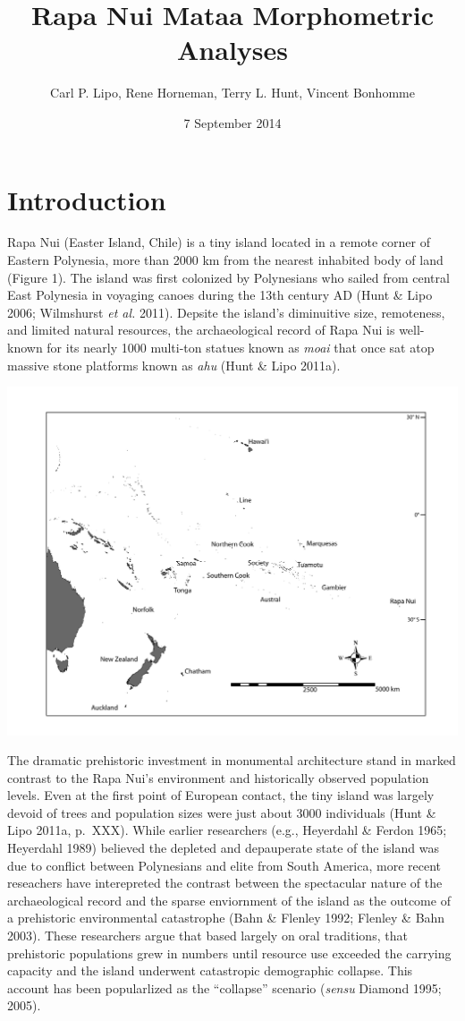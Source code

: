 \documentclass[]{article}
\title{Rapa Nui Mataa Morphometric Analyses}
\author{Carl P. Lipo, Rene Horneman, Terry L. Hunt, Vincent Bonhomme}
\date{7 September 2014}
\begin{document}
\maketitle


\section{Introduction}\label{introduction}

Rapa Nui (Easter Island, Chile) is a tiny island located in a remote
corner of Eastern Polynesia, more than 2000 km from the nearest
inhabited body of land (Figure 1). The island was first colonized by
Polynesians who sailed from central East Polynesia in voyaging canoes
during the 13th century AD (Hunt \& Lipo 2006; Wilmshurst \emph{et al.}
2011). Depsite the island's diminuitive size, remoteness, and limited
natural resources, the archaeological record of Rapa Nui is well-known
for its nearly 1000 multi-ton statues known as \emph{moai} that once sat
atop massive stone platforms known as \emph{ahu} (Hunt \& Lipo 2011a).

\includegraphics{../Figures/Figure1.pdf}

The dramatic prehistoric investment in monumental architecture stand in
marked contrast to the Rapa Nui's environment and historically observed
population levels. Even at the first point of European contact, the tiny
island was largely devoid of trees and population sizes were just about
3000 individuals (Hunt \& Lipo 2011a, p.~XXX). While earlier researchers
(e.g., Heyerdahl \& Ferdon 1965; Heyerdahl 1989) believed the depleted
and depauperate state of the island was due to conflict between
Polynesians and elite from South America, more recent reseachers have
interepreted the contrast between the spectacular nature of the
archaeological record and the sparse enviornment of the island as the
outcome of a prehistoric environmental catastrophe (Bahn \& Flenley
1992; Flenley \& Bahn 2003). These researchers argue that based largely
on oral traditions, that prehistoric populations grew in numbers until
resource use exceeded the carrying capacity and the island underwent
catastropic demographic collapse. This account has been popularlized as
the ``collapse'' scenario (\emph{sensu} Diamond 1995; 2005).
\end{document}
